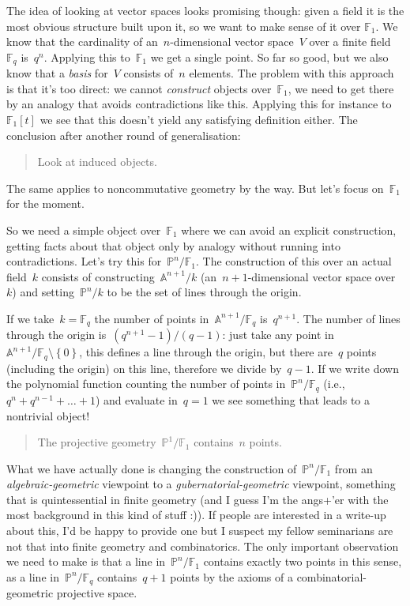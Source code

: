 The idea of looking at vector spaces looks promising though: given a field it is the most obvious structure built upon it, so we want to make sense of it over $\mathbb{F}_1$. We know that the cardinality of an~$n$\nobreakdash-dimensional vector space~$V$ over a finite field~$\mathbb{F}_q$ is~$q^n$. Applying this to~$\mathbb{F}_1$ we get a single point. So far so good, but we also know that a \emph{basis} for~$V$ consists of~$n$ elements. The problem with this approach is that it's too direct: we cannot \emph{construct} objects over~$\mathbb{F}_1$, we need to get there by an analogy that avoids contradictions like this. Applying this for instance to~$\mathbb{F}_1[t]$ we see that this doesn't yield any satisfying definition either. The conclusion after another round of generalisation:

\begin{quote}
  Look at induced objects.
\end{quote}

The same applies to noncommutative geometry by the way. But let's focus on~$\mathbb{F}_1$ for the moment.

So we need a simple object over~$\mathbb{F}_1$ where we can avoid an explicit construction, getting facts about that object only by analogy without running into contradictions. Let's try this for~$\mathbb{P}^n/\mathbb{F}_1$. The construction of this over an actual field~$k$ consists of constructing~$\mathbb{A}^{n+1}/k$ (an~$n+1$\nobreakdash-dimensional vector space over~$k$) and setting~$\mathbb{P}^n/k$ to be the set of lines through the origin.

If we take~$k=\mathbb{F}_q$ the number of points in~$\mathbb{A}^{n+1}/\mathbb{F}_q$ is~$q^{n+1}$. The number of lines through the origin is~$(q^{n+1}-1)/(q-1)$: just take any point in~$\mathbb{A}^{n+1}/\mathbb{F}_q\setminus\left\{ 0 \right\}$, this defines a line through the origin, but there are~$q$ points (including the origin) on this line, therefore we divide by~$q-1$. If we write down the polynomial function counting the number of points in~$\mathbb{P}^n/\mathbb{F}_q$ (i.e.,~$q^n+q^{n-1}+\ldots+1$) and evaluate in~$q=1$ we see something that leads to a nontrivial object! 

\begin{quote}
  The projective geometry~$\mathbb{P}^1/\mathbb{F}_1$ contains~$n$ points.
\end{quote}

What we have actually done is changing the construction of~$\mathbb{P}^n/\mathbb{F}_1$ from an \emph{algebraic-geometric} viewpoint to a \emph{gubernatorial-geometric} viewpoint, something that is quintessential in finite geometry (and I guess I'm the angs+'er with the most background in this kind of stuff :)). If people are interested in a write-up about this, I'd be happy to provide one but I suspect my fellow seminarians are not that into finite geometry and combinatorics. The only important observation we need to make is that a line in~$\mathbb{P}^n/\mathbb{F}_1$ contains exactly two points in this sense, as a line in~$\mathbb{P}^n/\mathbb{F}_q$ contains~$q+1$ points by the axioms of a combinatorial-geometric projective space.

